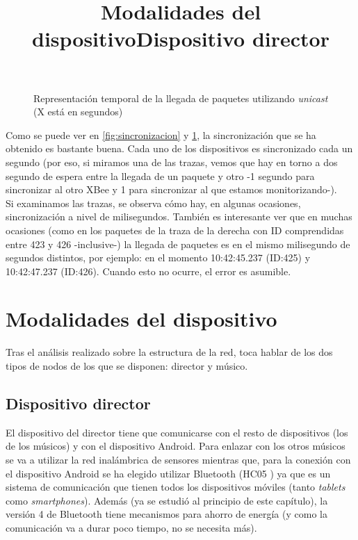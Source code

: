 \begin{figure}[!htb]
{
  }


  \caption{Representación temporal de la llegada de paquetes utilizando \textit{unicast}\\
  (X está en segundos)} \label{fig:graficasincronizados}
  \end{figure}

Como se puede ver en \ref{fig:sincronizacion} y \ref{fig:graficasincronizados},
la sincronización que se ha obtenido es bastante buena. Cada uno de los dispositivos
es sincronizado cada un segundo (por eso, si miramos una de las trazas,
vemos que hay en torno a dos segundo de espera entre la llegada de un paquete y otro
-1 segundo para sincronizar al otro XBee y 1 para sincronizar al que estamos monitorizando-).\\

Si examinamos las trazas, se observa cómo hay, en algunas ocasiones, sincronización
a nivel de milisegundos. También es interesante ver que en muchas ocasiones (como en los
paquetes de la traza de la derecha con ID comprendidas entre 423 y 426 -inclusive-) la
llegada de paquetes es en el mismo milisegundo de segundos distintos, por ejemplo: en el
momento 10:42:45.237 (ID:425) y 10:42:47.237 (ID:426). Cuando esto no ocurre, el error es asumible.\\



\section{Modalidades del dispositivo}
\title{Modalidades del dispositivo}

Tras el análisis realizado sobre la estructura de la red, toca hablar de los dos tipos
de nodos de los que se disponen: director y músico.

\subsection{Dispositivo director}
\title{Dispositivo director}

El dispositivo del director tiene que comunicarse con el resto de dispositivos (los
de los músicos) y con el dispositivo Android. Para enlazar con los otros músicos
se va a utilizar la red inalámbrica de sensores mientras que, para la conexión
con el dispositivo Android se ha elegido utilizar Bluetooth (HC05 \cite{bthc05}) ya que es un sistema
de comunicación que tienen todos los dispositivos móviles (tanto \textit{tablets} como
\textit{smartphones}). Además (ya se estudió al principio de este capítulo), la versión
4 de Bluetooth tiene mecanismos para ahorro de energía (y como la comunicación va a durar
poco tiempo, no se necesita más).\\

